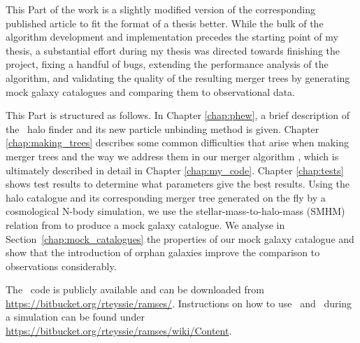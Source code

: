 This Part of the work is a slightly modified version of the corresponding published article
\citep{ivkovicACACIANewMethod2022} to fit the format of a thesis better. While the bulk of the
algorithm development and implementation precedes the starting point of my thesis, a substantial
effort during my thesis was directed towards finishing the project, fixing a handful of bugs,
extending the performance analysis of the algorithm, and validating the quality of the resulting
merger trees by generating mock galaxy catalogues and comparing them to observational data.

This Part is structured as follows. In Chapter \ref{chap:phew}, a brief description of the \phew\
halo finder and its new particle unbinding method is given. Chapter \ref{chap:making_trees}
describes some common difficulties that arise when making merger trees and the way we address them
in our merger algorithm \acacia, which is ultimately described in detail in Chapter
\ref{chap:my_code}. Chapter \ref{chap:tests} shows test results to determine what parameters give
the best results.  Using the halo catalogue and its corresponding merger tree generated on the fly
by a cosmological N-body simulation, we use the stellar-mass-to-halo-mass (SMHM) relation from
\cite{behrooziAVERAGESTARFORMATION2013} to produce a mock galaxy catalogue. We analyse in
Section~\ref{chap:mock_catalogues} the properties of our mock galaxy catalogue and show that the
introduction of orphan galaxies improve the comparison to observations considerably.

The \ramses\ code is  publicly available and  can be  downloaded from
\url{https://bitbucket.org/rteyssie/ramses/}. Instructions  on how to use \acacia\ and \phew\ during
a simulation can be found under \url{https://bitbucket.org/rteyssie/ramses/wiki/Content}.
